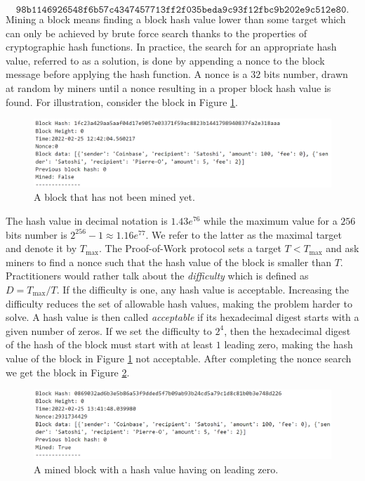 $$
\texttt{98b1146926548f6b57c4347457713ff2f035beda9c93f12fbc9b202e9c512e80}.
$$
Mining a block means finding a block hash value lower than some target which can only be achieved by brute force search thanks to the properties of cryptographic hash functions. In practice, the search for an appropriate hash value, referred to as a solution, is done by appending a nonce to the block message before applying the hash function. A nonce is a $32$ bits number, drawn at random by miners until a nonce resulting in a proper block hash value is found. For illustration, consider the block in Figure \ref{fig:block_not_mined}.

\begin{figure}[!ht]
		\includegraphics[width = \textwidth]{../Figures/block_not_mined.png}
		\captionsetup{width=0.8\textwidth}
		\centering
		\caption{A block that has not been mined yet.}
		\label{fig:block_not_mined}
\end{figure}
The hash value in decimal notation is $1.43e^{76}$ while the maximum value for a $256$ bits number is $2^{256}-1 \approx 1.16e^{77}$. We refer to the latter as the maximal target and denote it by $T_{\max}$. The Proof-of-Work protocol sets a target $T < T_{\max}$ and ask miners to find a nonce such that the hash value of the block is smaller than $T$. Practitioners would rather talk about the \textit{difficulty} which is defined as $D = T_{\max} / T$. If the difficulty is one, any hash value is acceptable. Increasing the difficulty reduces the set of allowable hash values, making the problem harder to solve. A hash value is then called \textit{acceptable} if its hexadecimal digest starts with a given number of zeros. If we set the difficulty to $2^4$, then the hexadecimal digest of the hash of the block must start with at least $1$ leading zero, making the hash value of the block in Figure \ref{fig:block_not_mined} not acceptable. After completing the nonce search we get the block in Figure \ref{fig:block_mined}.
\begin{figure}[!ht]
		\includegraphics[width = \textwidth]{../Figures/block_mined.png}
		\captionsetup{width=0.8\textwidth}
		\centering
		\caption{A mined block with a hash value having on leading zero.}
		\label{fig:block_mined}
\end{figure}
